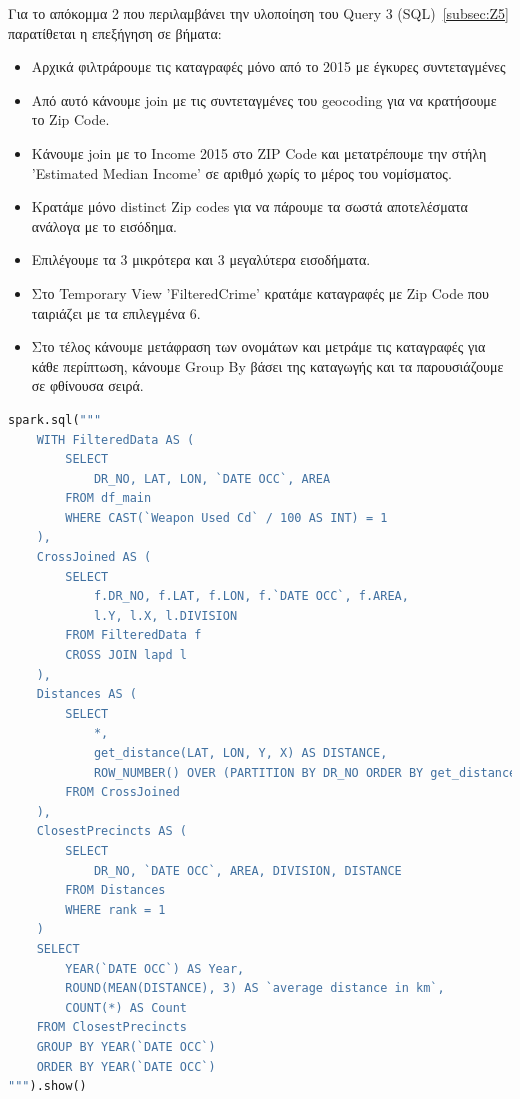 \documentclass{article}
\begin{document}
Για το απόκομμα 2 που περιλαμβάνει την υλοποίηση του Query 3 (SQL)~\ref{subsec:Z5} παρατίθεται η επεξήγηση σε βήματα: 
\begin{itemize}
    \item   Αρχικά φιλτράρουμε τις καταγραφές μόνο από το 2015 με έγκυρες συντεταγμένες
    \item   Από αυτό κάνουμε  join  με τις συντεταγμένες του geocoding  για να κρατήσουμε το  Zip Code. 
    \item   {} Κάνουμε  join  με το  Income 2015  στο  ZIP Code  και μετατρέπουμε την στήλη  'Estimated Median Income'  σε αριθμό χωρίς το μέρος του νομίσματος.
    \item   Κρατάμε μόνο  distinct Zip codes  για να πάρουμε τα σωστά αποτελέσματα ανάλογα με το εισόδημα.
    \item   Επιλέγουμε τα 3 μικρότερα και 3 μεγαλύτερα εισοδήματα.
    \item   Στο  Temporary View 'FilteredCrime'  κρατάμε καταγραφές με  Zip Code  που ταιριάζει με τα επιλεγμένα 6. 
    \item   Στο τέλος κάνουμε μετάφραση των ονομάτων και μετράμε τις καταγραφές για κάθε περίπτωση, κάνουμε  Group By βάσει της καταγωγής και τα παρουσιάζουμε σε φθίνουσα σειρά. 
\end{itemize}

\begin{lstlisting}[language=Python, caption={Query 4 2a - SQL}]
spark.sql("""
    WITH FilteredData AS (
        SELECT
            DR_NO, LAT, LON, `DATE OCC`, AREA
        FROM df_main
        WHERE CAST(`Weapon Used Cd` / 100 AS INT) = 1
    ),
    CrossJoined AS (
        SELECT
            f.DR_NO, f.LAT, f.LON, f.`DATE OCC`, f.AREA,
            l.Y, l.X, l.DIVISION
        FROM FilteredData f
        CROSS JOIN lapd l
    ),
    Distances AS (
        SELECT
            *,
            get_distance(LAT, LON, Y, X) AS DISTANCE,
            ROW_NUMBER() OVER (PARTITION BY DR_NO ORDER BY get_distance(LAT, LON, Y, X)) AS rank
        FROM CrossJoined
    ),
    ClosestPrecincts AS (
        SELECT
            DR_NO, `DATE OCC`, AREA, DIVISION, DISTANCE
        FROM Distances
        WHERE rank = 1
    )
    SELECT
        YEAR(`DATE OCC`) AS Year,
        ROUND(MEAN(DISTANCE), 3) AS `average distance in km`,
        COUNT(*) AS Count
    FROM ClosestPrecincts
    GROUP BY YEAR(`DATE OCC`)
    ORDER BY YEAR(`DATE OCC`)
""").show()
    
\end{lstlisting}
\end{document}
